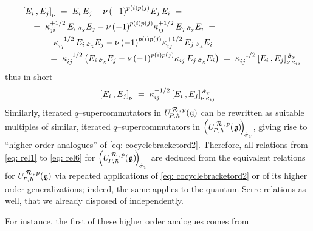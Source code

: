 \documentclass[12pt,reqno,twoside,a4paper]{amsart}
\numberwithin{equation}{section}
\theoremstyle{definition}
\newtheorem{free text}[lema]{}
\theoremstyle{remark}
\newcommand{\R}{{\mathcal R}}
\def \lieg{\mathfrak{g}}
\def \uRpPhg{U^{\,\R\,,\,p}_{\!P,\hskip0,7pt\hbar}(\hskip0,5pt\lieg)}
\newcommand{\sigmachi}{{\raise-1pt\hbox{$ \, \scriptstyle \dot\sigma_\chi $}}}
\theoremstyle{plain}
\begin{document}
%
  $$  \begin{aligned}
%
   &  \quad   {[E_i\,,E_j]}_\nu  \; = \;  E_i \, E_j - \nu \, {(-1)}^{p(i) p(j)} E_j \, E_i  \; =   \hfill  \\
   &  \quad \quad   = \;  \kappa_{ji}^{+1/2} \, E_i \sigmachi E_j - \nu \, {(-1)}^{p(i) p(j)} \kappa_{ij}^{+1/2} \, E_j \sigmachi E_i  \; =   \hfill  \\
   &  \quad \quad \quad   = \;  \kappa_{ij}^{-1/2} \, E_i \sigmachi E_j - \nu \, {(-1)}^{p(i) p(j)} \kappa_{ij}^{+1/2} \, E_j \sigmachi E_i  \; =   \hfill  \\
   &  \quad \quad \quad \quad   = \;  \kappa_{ij}^{-1/2} \, \big( E_i \sigmachi E_j - \nu \, {(-1)}^{p(i) p(j)} \kappa_{ij} \, E_j \sigmachi E_i \big)  \; = \;  \kappa_{ij}^{-1/2} \, {[E_i\,,E_j]}^\sigmachi_{\nu \,\kappa_{ij}}
%
      \end{aligned}  $$
%
 thus in short
%
\begin{equation}  \label{eq: cocyclebracketord2}
%
  {[E_i\,,E_j]}_\nu  \; = \;  \kappa_{ij}^{-1/2} \, {[E_i\,,E_j]}^\sigmachi_{\nu \,\kappa_{ij}}
%
\end{equation}
%
 Similarly, iterated  $ q $--supercommutators  in  $ \uRpPhg $  can be rewritten as suitable multiples of similar, iterated  $ q $--supercommutators  in  $ {\Big( \uRpPhg \!\Big)}_{\!\!\sigmachi} $,  giving rise to ``higher order analogues'' of  \eqref{eq: cocyclebracketord2}.  Therefore, all relations from  \eqref{eq: rel1}  to  \eqref{eq: rel6}  for  $ {\Big( \uRpPhg \!\Big)}_{\!\!\sigmachi} $  are deduced from the equivalent relations for  $ \uRpPhg $  via repeated applications of  \eqref{eq: cocyclebracketord2}  or of its higher order generalizations; indeed, the same applies to the quantum Serre relations as well, that we already disposed of independently.
                                                                         \par
   For instance, the first of these higher order analogues comes from
%
\end{document}
